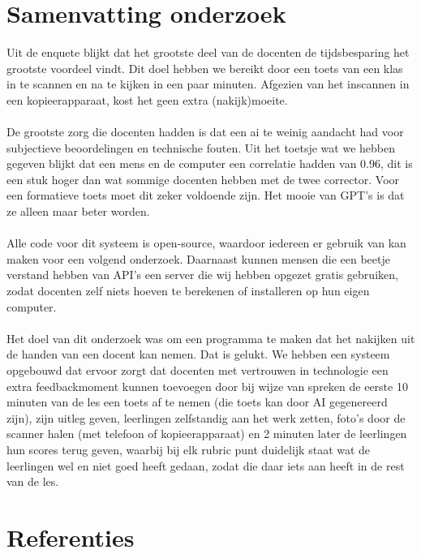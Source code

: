 \documentclass[12pt]{article}
\begin{document}
\section{Samenvatting onderzoek}
\begin{multicols}{2}
Uit de enquete blijkt dat het grootste deel van de docenten de tijdsbesparing het grootste voordeel vindt. Dit doel hebben we bereikt door een toets van een klas in te scannen en na te kijken in een paar minuten. Afgezien van het inscannen in een kopieerapparaat, kost het geen extra (nakijk)moeite.\\
\\
De grootste zorg die docenten hadden is dat een ai te weinig aandacht had voor subjectieve beoordelingen en technische fouten. Uit het toetsje wat we hebben gegeven blijkt dat een mens en de computer een correlatie hadden van 0.96, dit is een stuk hoger dan wat sommige docenten hebben met de twee corrector. Voor een formatieve toets moet dit zeker voldoende zijn. Het mooie van GPT's is dat ze alleen maar beter worden.\\
\\
Alle code voor dit systeem is open-source, waardoor iedereen er gebruik van kan maken voor een volgend onderzoek. Daarnaast kunnen mensen die een beetje verstand hebben van API's een server die wij hebben opgezet gratis gebruiken, zodat docenten zelf niets hoeven te berekenen of installeren op hun eigen computer.\\
\\
Het doel van dit onderzoek was om een programma te maken dat het nakijken uit de handen van een docent kan nemen. Dat is gelukt. We hebben een systeem opgebouwd dat ervoor zorgt dat docenten met vertrouwen in technologie een extra feedbackmoment kunnen toevoegen door bij wijze van spreken de eerste 10 minuten van de les een toets af te nemen (die toets kan door AI gegenereerd zijn), zijn uitleg geven, leerlingen zelfstandig aan het werk zetten, foto's door de scanner halen (met telefoon of kopieerapparaat) en 2 minuten later de leerlingen hun scores terug geven, waarbij bij elk rubric punt duidelijk staat wat de leerlingen wel en niet goed heeft gedaan, zodat die daar iets aan heeft in de rest van de les. \\ 
\end{multicols}

\section{Referenties}
\end{document}
